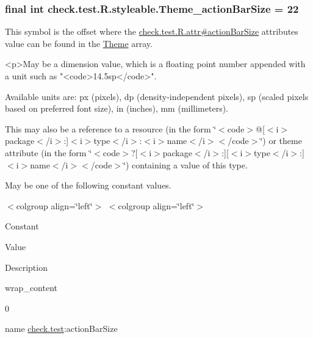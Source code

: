 \subsubsection[{Theme\+\_\+action\+Bar\+Size}]{\setlength{\rightskip}{0pt plus 5cm}final int check.\+test.\+R.\+styleable.\+Theme\+\_\+action\+Bar\+Size = 22\hspace{0.3cm}{\ttfamily [static]}}\label{classcheck_1_1test_1_1_r_1_1styleable_af17d29383b2372457182672f93aeb8e6}
This symbol is the offset where the \hyperlink{classcheck_1_1test_1_1_r_1_1attr_a402641d680366de8aaf8c4fb48bda10f}{check.\+test.\+R.\+attr\#action\+Bar\+Size} attribute\textquotesingle{}s value can be found in the \hyperlink{classcheck_1_1test_1_1_r_1_1styleable_acca726d02016a0cf607782ec3a436a81}{Theme} array.

\begin{DoxyVerb}      <p>May be a dimension value, which is a floating point number appended with a unit such as "<code>14.5sp</code>".
\end{DoxyVerb}
 Available units are\+: px (pixels), dp (density-\/independent pixels), sp (scaled pixels based on preferred font size), in (inches), mm (millimeters). 

This may also be a reference to a resource (in the form \char`\"{}$<$code$>$@\mbox{[}$<$i$>$package$<$/i$>$\+:\mbox{]}$<$i$>$type$<$/i$>$\+:$<$i$>$name$<$/i$>$$<$/code$>$\char`\"{}) or theme attribute (in the form \char`\"{}$<$code$>$?\mbox{[}$<$i$>$package$<$/i$>$\+:\mbox{]}\mbox{[}$<$i$>$type$<$/i$>$\+:\mbox{]}$<$i$>$name$<$/i$>$$<$/code$>$\char`\"{}) containing a value of this type. 

May be one of the following constant values.

\begin{TabularC}{0}
\hline
\end{TabularC}
$<$colgroup align=\char`\"{}left\char`\"{}$>$ $<$colgroup align=\char`\"{}left\char`\"{}$>$ 

Constant

Value

Description 

{\ttfamily wrap\+\_\+content}

0

name \hyperlink{namespacecheck_1_1test}{check.\+test}\+:action\+Bar\+Size \hypertarget{classcheck_1_1test_1_1_r_1_1styleable_a9f5d8b45ed85a61b92f887aa336f3adf}{}

